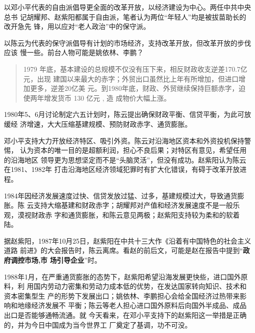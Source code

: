 以邓小平代表的自由派倡导更全面的改革开放，以经济建设为中心。两任中共中央总书
记胡耀邦、赵紫阳都属于自由派，笔者认为两位“年轻人”均是被拔苗助长的改开急先
锋，用以应对“老人政治”中的保守派。

以陈云为代表的保守派倡导有计划的市场经济，支持改革开放，但改革开放的步伐应该
慢一些。前台人物可能是姚依林、李鹏？

\begin{quotation}
  1979 年底，基本建设的总规模不仅没有压下来，相反财政收支逆差170.7亿元，出现
  建国以来最大的赤字；外贸出口虽然比上年有所增加，但进口增加更多，逆差20亿美
  元。到1980年底，财政、外贸继续保持巨额赤字，迫使两年增发货币 130 亿元 , 造
  成物价大幅上涨。\cite{chenyunjihua}
\end{quotation}

1980年5、6月讨论制定六五计划时，陈云提出确保财政平衡、信贷平衡，为此可放缓经
济增速，大大压缩基建规模、预防财政赤字、通货膨胀。

邓小平支持大力开放经济特区、吸引外资。陈云对沿海地区资本和外资投机保持警惕，
认为资本的唯一目的是超额利润，担心不良后果；对特区有意见，希望任用的沿海地区
领导更为思想坚定而不是“头脑灵活”，但没有成功。赵紫阳认为陈云在1981、1982年
打击沿海地区经济领域犯罪时有扩大化错误，有碍于改革开放进程。

1984年因经济发展速度过快、信贷发放过猛、过多，基建规模过大，导致通货膨胀。陈
云支持大缩基建和财政赤字；胡耀邦对产值和经济发展速度不是一般乐观，漠视财政赤
字和通货膨胀，和陈云意见两极；赵紫阳支持较为柔和的软着陆。


据赵紫阳，1987年10月25日，赵紫阳在中共十三大作《沿着有中国特色的社会主义道路
前进》的大会报告时，陈云离席。看赵的前后文，可能是赵在报告中提到“\textbf{政府调控市场,市
  场引导企业}”时。

1988年1月，在严重通货膨胀的态势下，赵紫阳希望沿海发展更快些，进口国外原料，利
用国内劳动力密集和劳动力成本低的优势，在发达国家转向知识、技术和资本密集型生
产的形势下发展出口；姚依林、李鹏担心会给全国经济过热带来影响和地缘经济发展不
平衡；陈云等老人担心进口国外原料后向国外半成品、成品出口是否能够通畅流通。就
今天看来，在邓小平支持下的赵紫阳这一举措是正确的，并为今日中国成为当今世界工
厂奠定了基调，功不可没。

